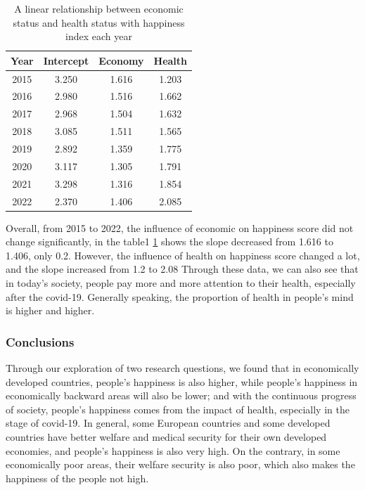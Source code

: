 \documentclass[11pt,a4paper,]{article}
\begin{document}
\begin{table}
\centering
\begin{tabular}{|c|c|c|c|}
\hline
\textbf{Year} & \textbf{Intercept} & \textbf{Economy} & \textbf{Health} \\
\hline
2015          & 3.250              & 1.616            & 1.203           \\
2016          & 2.980              & 1.516            & 1.662           \\
2017          & 2.968              & 1.504            & 1.632           \\
2018          & 3.085              & 1.511            & 1.565           \\
2019          & 2.892              & 1.359            & 1.775           \\
2020          & 3.117              & 1.305            & 1.791           \\
2021          & 3.298              & 1.316            & 1.854           \\
2022          & 2.370              & 1.406            & 2.085           \\
\hline
\end{tabular}
\caption{A linear relationship between economic status and health status with happiness index each year}
\label{tab:table}
\end{table}

Overall, from 2015 to 2022, the influence of economic on happiness score did not change significantly, in the table1 \ref{tab:table} shows the slope decreased from 1.616 to 1.406, only 0.2. However, the influence of health on happiness score changed a lot, and the slope increased from 1.2 to 2.08 Through these data, we can also see that in today's society, people pay more and more attention to their health, especially after the covid-19. Generally speaking, the proportion of health in people's mind is higher and higher.

\hypertarget{conclusions}{%
\subsubsection{Conclusions}\label{conclusions}}

Through our exploration of two research questions, we found that in economically developed countries, people's happiness is also higher, while people's happiness in economically backward areas will also be lower; and with the continuous progress of society, people's happiness comes from the impact of health, especially in the stage of covid-19. In general, some European countries and some developed countries have better welfare and medical security for their own developed economies, and people's happiness is also very high. On the contrary, in some economically poor areas, their welfare security is also poor, which also makes the happiness of the people not high.

\printbibliography
\end{document}
